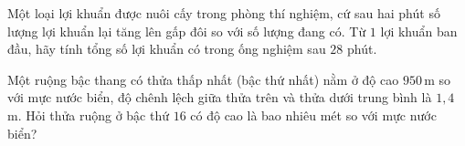 \begin{bt}%
Một loại lợi khuẩn được nuôi cấy trong phòng thí nghiệm, cứ sau hai phút số lượng lợi khuẩn lại tăng lên gấp đôi so với số lượng đang có. Từ $ 1$ lợi khuẩn ban đầu, hãy tính tổng số lợi khuẩn có trong ống nghiệm sau $ 28$ phút.
\end{bt}

\begin{bt}%
Một ruộng bậc thang có thửa thấp nhất (bậc thứ nhất) nằm ở độ cao $950$\,m so với mực nước biển, độ chênh lệch giữa thửa trên và thửa dưới trung bình là $1{,}4$\,m. Hỏi thửa ruộng ở bậc thứ $16$ có độ cao là bao nhiêu mét so với mực nước biển?
\end{bt}

